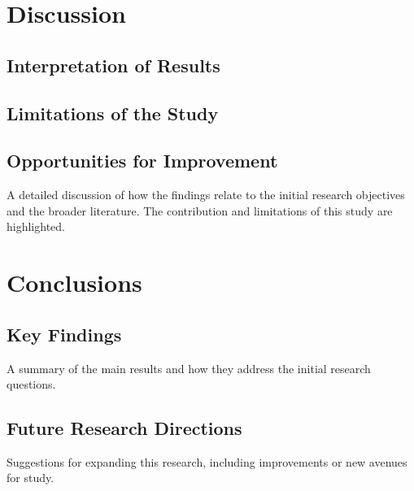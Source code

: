 \documentclass[a4paper,12pt]{report}
\begin{document}
\chapter{Discussion}

\section{Interpretation of Results}

\section{Limitations of the Study}

\section{Opportunities for Improvement}


A detailed discussion of how the findings relate to the initial research objectives and the broader literature. The contribution and limitations of this study are highlighted.

\chapter{Conclusions}

\section{Key Findings}
A summary of the main results and how they address the initial research questions.

\section{Future Research Directions}
Suggestions for expanding this research, including improvements or new avenues for study.
\end{document}
